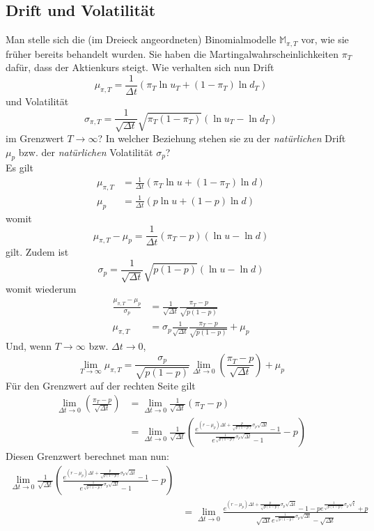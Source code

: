 \documentclass[11pt]{report} %
\begin{document}
\subsection{Drift und Volatilität}
Man stelle sich die (im Dreieck angeordneten) Binomialmodelle $\mathbb{M}_{\pi, T}$ vor, wie sie früher bereits behandelt wurden. Sie haben die Martingalwahrscheinlichkeiten $\pi_T$ dafür, dass der Aktienkurs steigt. Wie verhalten sich nun Drift $$\mu_{\pi, T}=\frac{1}{\Delta t}(\pi_T\ln{u_T}+(1-\pi_T)\ln{d_T})$$ und Volatilität $$\sigma_{\pi, T}=\frac{1}{\sqrt{\Delta t}}\sqrt{\pi_T(1-\pi_T)}(\ln{u_T}-\ln{d_T})$$ im Grenzwert $T\to\infty$? In welcher Beziehung stehen sie zu der \textit{natürlichen} Drift $\mu_p$ bzw. der \textit{natürlichen} Volatilität $\sigma_p$?
\\Es gilt
\begin{align*}
    \mu_{\pi, T}&=\frac{1}{\Delta t}(\pi_T\ln{u}+(1-\pi_T)\ln{d})\\
    \mu_p&=\frac{1}{\Delta t}(p\ln{u}+(1-p)\ln{d})
\end{align*}
womit $$\mu_{\pi, T}-\mu_p=\frac{1}{\Delta t}(\pi_T-p)(\ln{u}-\ln{d})$$
gilt. Zudem ist $$\sigma_p=\frac{1}{\sqrt{\Delta t}}\sqrt{p(1-p)}(\ln{u}-\ln{d})$$
womit wiederum 
\begin{align*}
    \frac{\mu_{\pi, T}-\mu_p}{\sigma_p}&=\frac{1}{\sqrt{\Delta t}}\frac{\pi_T-p}{\sqrt{p(1-p)}}\\
    \mu_{\pi, T}&=\sigma_p\frac{1}{\sqrt{\Delta t}}\frac{\pi_T-p}{\sqrt{p(1-p)}}+\mu_p
\end{align*}
Und, wenn $T\rightarrow\infty$ bzw. $\Delta t \to 0$,
$$\lim_{T\to\infty}\mu_{\pi, T}=\frac{\sigma_p}{\sqrt{p(1-p)}}\lim_{\Delta t \to 0}\left(\frac{\pi_T-p}{\sqrt{\Delta t}}\right)+\mu_p$$
Für den Grenzwert auf der rechten Seite gilt 
\begin{align*}
    \lim_{\Delta t \to 0}\left(\frac{\pi_T-p}{\sqrt{\Delta t}}\right)&=\lim_{\Delta t \to 0}\frac{1}{\sqrt{\Delta t}}(\pi_T-p)\\
    &=\lim_{\Delta t \to 0}\frac{1}{\sqrt{\Delta t}}\left(\frac{e^{(r-\mu_p)\Delta t+\frac{p}{\sqrt{p(1-p)}}\sigma_p\sqrt{\Delta t}}-1}{e^{\frac{1}{\sqrt{p(1-p)}}\sigma_p\sqrt{\Delta t}}-1}-p\right)
\end{align*}
Diesen Grenzwert berechnet man nun:
\begin{align*}
    \lim_{\Delta t \to 0}\frac{1}{\sqrt{\Delta t}}\left(\frac{e^{(r-\mu_p)\Delta t+\frac{p}{\sqrt{p(1-p)}}\sigma_p\sqrt{\Delta t}}-1}{e^{\frac{1}{\sqrt{p(1-p)}}\sigma_p\sqrt{\Delta t}}-1}-p\right)\\
    &=\lim_{\Delta t \to 0}\frac{e^{(r-\mu_p)\Delta t+\frac{p}{\sqrt{p(1-p)}}\sigma_p\sqrt{\Delta t}}-1-pe^{\frac{1}{\sqrt{p(1-p)}}\sigma_p\sqrt{t}}+p}{\sqrt{\Delta t}e^{\frac{1}{\sqrt{p(1-p)}}\sigma_p\sqrt{\Delta t}}-\sqrt{\Delta t}}
\end{align*}
\end{document}
